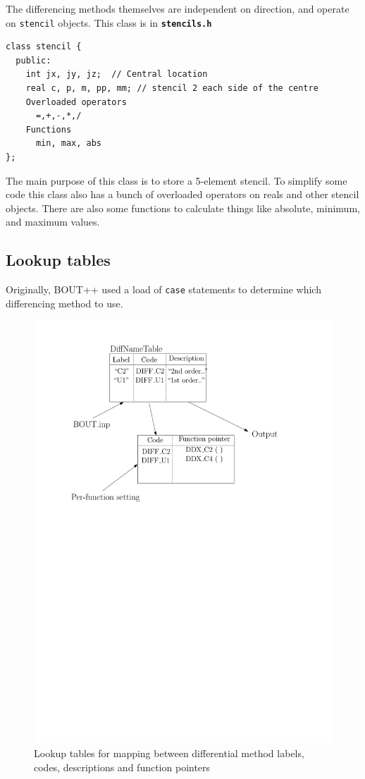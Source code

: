 \documentclass[12pt]{article}
\newcommand{\code}[1]{\texttt{#1}}
\newcommand{\file}[1]{\texttt{\bf #1}}
\begin{document}
The differencing methods themselves are independent on direction, and operate on \code{stencil}
objects. This class is in \file{stencils.h}
\begin{lstlisting}
class stencil {
  public:
    int jx, jy, jz;  // Central location
    real c, p, m, pp, mm; // stencil 2 each side of the centre
    Overloaded operators
      =,+,-,*,/
    Functions
      min, max, abs
};
\end{lstlisting}
The main purpose of this class is to store a 5-element stencil. To simplify some code
this class also has a bunch of overloaded operators on reals and other stencil objects. 
There are also some functions to calculate things like absolute, minimum, and maximum
values.

\subsection{Lookup tables}

Originally, BOUT++ used a load of \code{case} statements to determine
which differencing method to use. 

\begin{figure}[htb!]
\centering
\includegraphics[scale=0.75]{figs/diffLookup.pdf}
\caption{Lookup tables for mapping between differential method labels, codes, descriptions and function pointers}
\label{fig:diffLookup}
\end{figure}
\end{document}
